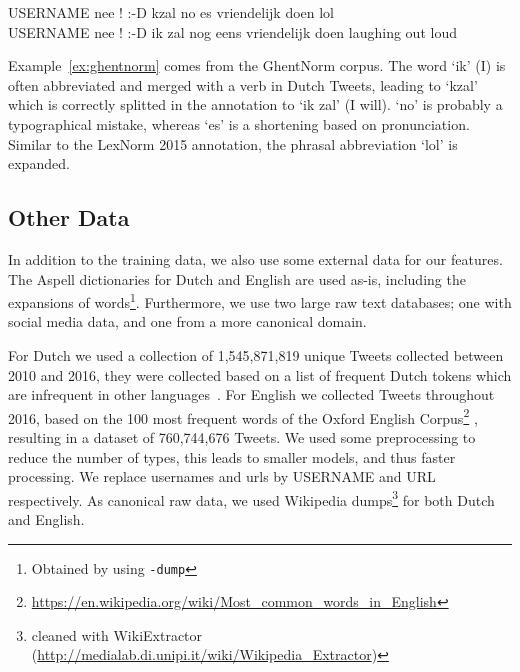 \documentclass[a4paper,10pt,twoside]{article}
\begin{document}
\begin{exe}
    \ex \gll USERNAME nee ! :-D kzal no es vriendelijk doen lol \\
     USERNAME nee ! :-D {ik zal} nog eens vriendelijk doen {laughing out loud} \\
\label{ex:ghentnorm}
\end{exe}

Example~\ref{ex:ghentnorm} comes from the GhentNorm corpus. The word `ik' (I)
is often abbreviated and merged with a verb in Dutch Tweets, leading to `kzal'
which is correctly splitted in the annotation to `ik zal' (I will). `no' is
probably a typographical mistake, whereas `es' is a shortening based on
pronunciation. Similar to the LexNorm 2015 annotation, the phrasal abbreviation
`lol' is expanded.







\subsection{Other Data}
\label{data:other}
In addition to the training data, we also use some external data for our
features. The Aspell dictionaries for Dutch and English are used as-is,
including the expansions of words\footnote{Obtained by using \texttt{-dump}}.
Furthermore, we use two large raw text databases; one with social media data,
and one from a more canonical domain. 

For Dutch we used a collection of 1,545,871,819 unique Tweets collected between
2010 and 2016, they were collected based on a list of frequent Dutch tokens
which are infrequent in other languages~\cite{42}. For English we collected
Tweets throughout 2016, based on the 100 most frequent words of the Oxford
English
Corpus\footnote{\url{https://en.wikipedia.org/wiki/Most_common_words_in_English}}
, resulting in a dataset of 760,744,676 Tweets.  We used some preprocessing to
reduce the number of types, this leads to smaller models, and thus faster
processing. We replace usernames and urls by USERNAME and URL
respectively.  As canonical raw data, we used Wikipedia dumps\footnote{cleaned
with WikiExtractor
(\url{http://medialab.di.unipi.it/wiki/Wikipedia_Extractor})} for both Dutch
and English.


 
\end{document}
